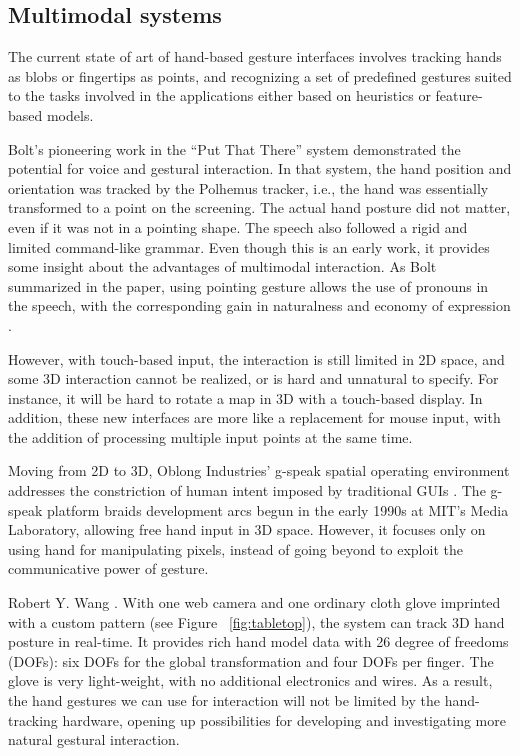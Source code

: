 \subsection{Multimodal systems}
The current state of art of hand-based gesture
interfaces involves tracking hands as blobs or fingertips as points, and recognizing a set of
predefined gestures suited to the tasks involved in the applications
either based on heuristics or feature-based models.

Bolt's pioneering work in the ``Put That There'' system \cite{Bolt80} 
demonstrated the potential for voice and gestural interaction.  In that system, 
the hand position and orientation was tracked by the Polhemus tracker, i.e., the
hand was essentially transformed to a point on the screening. The actual hand 
posture did not matter, even if it was not in a pointing shape. The speech also 
followed a rigid and limited command-like grammar. Even though this is an early 
work, it provides some insight about the advantages of multimodal interaction. 
As Bolt summarized in the paper, using pointing gesture allows the use of 
pronouns in the speech, with the corresponding gain in naturalness and economy 
of expression \cite{Bolt80}.

However, with 
touch-based input, the interaction is still limited in 2D space, and some 3D 
interaction cannot be realized, or is hard and unnatural to specify. For 
instance, it will be hard to rotate a map in 3D with a touch-based display. In 
addition, these new interfaces are more like a replacement for mouse input, with
the addition of processing multiple input points at the same time.

Moving from 2D to 3D, Oblong Industries' g-speak spatial operating environment 
addresses the constriction of human intent imposed by traditional GUIs 
\cite{Oblong09}. The g-speak platform braids development arcs begun in the early
1990s at MIT's Media Laboratory, allowing free hand input in 3D space. However, 
it focuses only on using hand for manipulating pixels, instead of going beyond 
to exploit the communicative power of gesture.

Robert Y. Wang \cite{Wang09}. With one web camera and one ordinary cloth glove imprinted with a custom pattern (see Figure ~\ref{fig:tabletop}), the system can track 3D hand posture in real-time. It provides rich hand model data with 26 degree of freedoms (DOFs): six DOFs for the global transformation and four DOFs per finger. The glove is very light-weight, with no additional electronics and wires. As a result, the hand gestures we can use for interaction will not be limited by the hand-tracking hardware, opening up possibilities for developing and investigating more natural gestural interaction.

